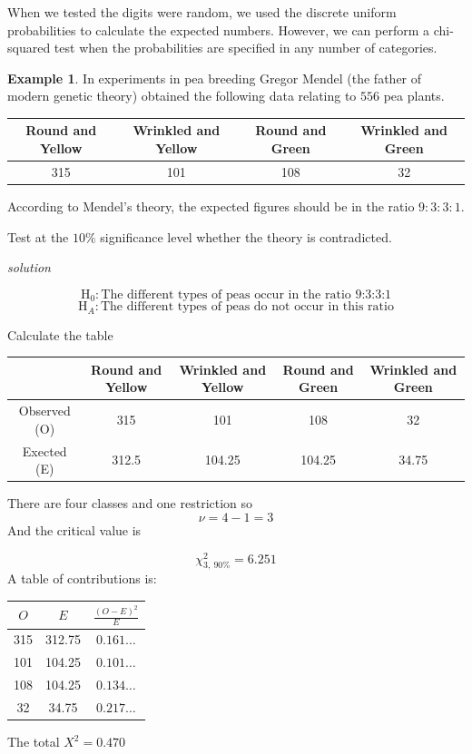 \documentclass[
]{book}
\theoremstyle{definition}
\theoremstyle{definition}
\newtheorem{example}{Example}[chapter]
\theoremstyle{definition}
\theoremstyle{definition}
\theoremstyle{remark}
\begin{document}
When we tested the digits were random, we used the discrete uniform probabilities to calculate the expected numbers. However, we can perform a chi-squared test when the probabilities are specified in any number of categories.

\begin{example}
In experiments in pea breeding Gregor Mendel (the father of modern genetic theory) obtained the following data relating to \(556\) pea plants.

\begin{longtable}[]{@{}cccc@{}}
\toprule
Round and Yellow & Wrinkled and Yellow & Round and Green & Wrinkled and Green\tabularnewline
\midrule
\endhead
315 & 101 & 108 & 32\tabularnewline
\bottomrule
\end{longtable}

According to Mendel's theory, the expected figures should be in the ratio \(9:3:3:1\).

Test at the \(10\%\) significance level whether the theory is contradicted.
\end{example}

\emph{solution}

\[\text{H}_0: \text{The different types of peas occur in the ratio 9:3:3:1}\]
\[\text{H}_A: \text{The different types of peas do not occur in this ratio}\]

Calculate the table

\begin{longtable}[]{@{}ccccc@{}}
\toprule
& Round and Yellow & Wrinkled and Yellow & Round and Green & Wrinkled and Green\tabularnewline
\midrule
\endhead
Observed (O) & 315 & 101 & 108 & 32\tabularnewline
Exected (E) & 312.5 & 104.25 & 104.25 & 34.75\tabularnewline
\bottomrule
\end{longtable}

There are four classes and one restriction so
\[\nu = 4-1=3\]
And the critical value is

\[\chi^2_{3, \ 90\%} = 6.251\]
A table of contributions is:

\begin{longtable}[]{@{}ccc@{}}
\toprule
\(O\) & \(E\) & \(\frac{(O-E)^2}{E}\)\tabularnewline
\midrule
\endhead
315 & 312.75 & \(0.161\ldots\)\tabularnewline
101 & 104.25 & \(0.101\ldots\)\tabularnewline
108 & 104.25 & \(0.134\ldots\)\tabularnewline
32 & 34.75 & \(0.217\ldots\)\tabularnewline
\bottomrule
\end{longtable}

The total \(X^2 = 0.470\)
\end{document}
